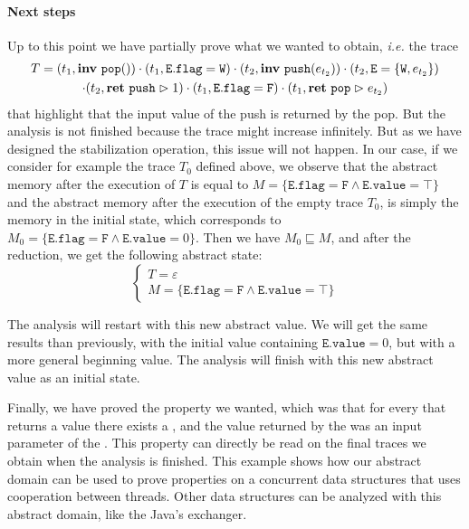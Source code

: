 \paragraph{Next steps} Up to this point we have partially prove what we wanted to obtain, \emph{i.e.} the trace
\begin{multline*}
T = (t_1, \mathbf{inv}\ \mathtt{pop}())\cdot (t_1, \mathtt{E.flag} = \mathtt{W}) \cdot (t_2, \mathbf{inv}\ \mathtt{push}(e_{t_2})) \cdot (t_2, \mathtt{E} = \{\mathtt{W}, e_{t_2}\}) \\
\cdot (t_2, \mathbf{ret}\ \mathtt{push} \vartriangleright 1) \cdot (t_1, \mathtt{E.flag} = \mathtt{F}) \cdot (t_1, \mathbf{ret}\ \mathtt{pop} \vartriangleright e_{t_2})
\end{multline*}
that highlight that the input value of the push is returned by the pop. But the analysis is not finished because the trace might increase infinitely. 
But as we have designed the stabilization operation, this issue will not happen. In our case, if we consider for example the trace $T_0$ defined above, we observe that the abstract memory after the execution of $T$ is equal to $M = \{\mathtt{E.flag} = \mathtt{F} \wedge \mathtt{E.value} = \top\}$ and the abstract memory after the execution of the empty trace $T_0$, is simply the memory in the initial state, which corresponds to $M_0 = \{\mathtt{E.flag} = \mathtt{F} \wedge \mathtt{E.value} = 0\}$. Then we have $M_0 \sqsubseteq M$, and after the reduction, we get the following abstract state:
\[
\begin{cases}
	T = \varepsilon\\
	M = \{\mathtt{E.flag} = \mathtt{F} \wedge \mathtt{E.value} = \top\}
\end{cases}
\]

The analysis will restart with this new abstract value. We will get the same results than previously, with the initial value containing $\mathtt{E.value} = 0$, but with a more general beginning value. The analysis will finish with this new abstract value as an initial state.

\bigskip

Finally, we have proved the property we wanted, which was that for every  that returns a value there exists a , and the value returned by the  was an input parameter of the . This property can directly be read on the final traces we obtain when the analysis is finished. This example shows how our abstract domain can be used to prove properties on a concurrent data structures that uses cooperation between threads. Other data structures can be analyzed with this abstract domain, like the Java's exchanger. 


